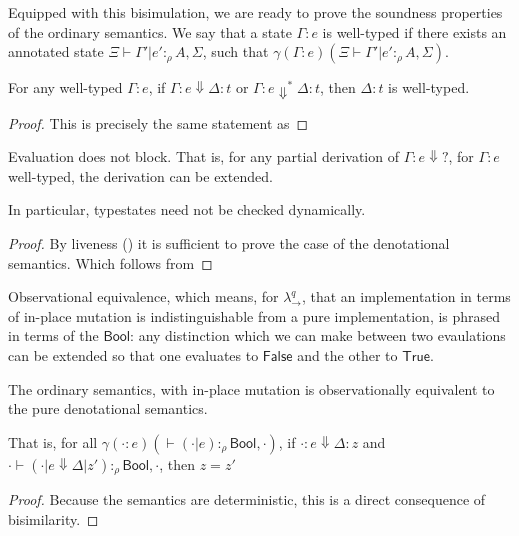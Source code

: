 \documentclass[acmsmall,screen]{acmart}\settopmatter{}
\newcommand{\Conid}[1]{\mathit{#1}}
\newcommand{\Varid}[1]{\mathit{#1}}
\renewcommand\Varid[1]{\mathord{\textsf{#1}}}
\renewcommand\Conid[1]{\mathord{\textsf{#1}}}
\newcommand{\varid}[1]{\ensuremath{\Varid{#1}}}
\newcommand{\ta}[2]{γ(#1)(#2)}
\newcommand\calc{{\ensuremath{λ^q_\to}}}
\begin{document}
{Equipped with this bisimulation, we are ready to prove the soundness
properties of the ordinary semantics. We say that a state $Γ:e$ is
well-typed if there exists an annotated state $Ξ⊢Γ'|e':_ρ A,Σ$, such
that $\ta{Γ:e}{Ξ⊢Γ'|e':_ρ A,Σ}$.

{
\renewcommand{\thetheorem}{\ref{thm:type-preservation}}
\begin{theorem}
  For any well-typed $Γ:e$, if $Γ:e⇓Δ:t$ or $Γ:e⇓^*Δ:t$, then $Δ:t$ is
  well-typed.
\end{theorem}
\addtocounter{theorem}{-1}
}
\begin{proof}
  This is precisely the same statement as 
\end{proof}
{
\renewcommand{\thetheorem}{\ref{thm:progress}}
\begin{theorem}[Progress]
  Evaluation does not block. That is, for any partial derivation of
  $Γ:e⇓?$, for $Γ:e$ well-typed, the derivation can be
  extended.

  In particular, typestates need not be checked dynamically.
\end{theorem}
\addtocounter{theorem}{-1}
}
\begin{proof}
  By liveness () it is sufficient to prove the case
  of the denotational semantics. Which follows from 
\end{proof}

Observational equivalence, which means, for \calc{}, that an
implementation in terms of in-place mutation is indistinguishable from
a pure implementation, is phrased in terms of the \ensuremath{\Conid{Bool}}: any
distinction which we can make between two evaulations can be
extended so that one evaluates to \ensuremath{\Conid{False}} and the other to \ensuremath{\Conid{True}}.
{
\renewcommand{\thetheorem}{\ref{thm:obs-equiv}}
\begin{theorem}
  The ordinary semantics, with in-place mutation is observationally equivalent
  to the pure denotational semantics.

  That is, for all $\ta{⋅:e}{⊢ (⋅|e) :_ρ \varid{Bool},⋅}$, if $⋅:e ⇓ Δ:z$ and
  $⋅ ⊢ (⋅|e⇓ Δ|z')  :_ρ \varid{Bool}, ⋅ $, then $z=z'$
\end{theorem}
\addtocounter{theorem}{-1}
}
\begin{proof}
  Because the semantics are deterministic, this is a direct
  consequence of bisimilarity.
\end{proof}
}
\fi
\end{document}
